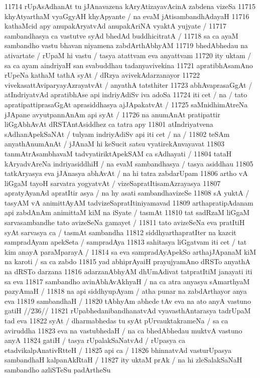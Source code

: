 11714 rUpAsAdhanAt tu jJAnavazena kAryAtizayavAcinA zabdena vizeSa
11715 khyAtyarthaM vyaGgyAH khyApyante / na evaM jAtisambandhAdayaH 
11716 kathaMcid apy anupakAryatvAd anupakAriNA vyaktA yujyate /
11717 	sambandhasya ca vastutve syAd bhedAd buddhicitratA / 
11718 sa ca ayaM sambandho vastu bhavan niyamena zabdArthAbhyAM 
11719 bhedAbhedau na ativartate / rUpaM hi vastu / tasya atattvam eva anyattvam 
11720 ity uktam / sa ca ayam aindriyaH san svabuddhau tadanyavivekina 
11721 apratibhAsamAno rUpeNa kathaM tathA syAt / dRzya avivekAdarzanayor
11722 vivekasattAviparyayAzrayatvAt / anyathA tatsthiter
11723 abhAvaprasaGgAt / atIndriyatvAd apratibhAse api indriyAdiSv iva adoSa
11724 iti cet / na / tato apratipattiprasaGgAt aprasiddhasya ajJApakatvAt / 
11725 saMnidhimAtreNa jJApane avyutpannAnAm api syAt /  
11726 na anumAnAt pratipattir liGgAbhAvAt dRSTAntAsiddhez ca tatra apy 
11801 atIndriyatvena sAdhanApekSaNAt / tulyam indriyAdiSv api iti cet / na /
11802 teSAm anyathAnumAnAt / jJAnaM hi keSucit satsu vyatirekAnvayavat
11803 tanmAtrAsambhavaM tadvyatiriktApekSAM ca sAdhayati / 
11804 tataH kAryadvAreNa indriyasiddhiH / na evaM sambandhasya / tasya asiddhau
11805 tatkAryasya eva jJAnasya abhAvAt / na hi tatra zabdarUpam 
11806 artho vA liGgaM tayoH sarvatra yogyatvAt / vizeSapratItisamAzrayasya
11807 apratyAyanAd apratItir asya / na hy asati sambandhavizeSe 
11808 sA yuktA / tasyAM vA animittAyAM tadvizeSapratItiniyamavad  
11809 arthapratipAdanam api zabdAnAm animittaM kiM na iSyate / tasmAt
11810 tat sadRzaM liGgaM sarvasambandhe tato avizeSeNa gamayet /
11811 tato avizeSeNa eva pratItiH syAt sarvasya ca / tasmAt sambandha 
11812 siddhyarthapratIter na kazcit sampradAyam apekSeta / sampradAya  
11813 sahitasya liGgatvam iti cet / tat kim anayA paraMparayA /
11814 sa eva sampradAyApekSo arthajJApanaM kiM na karoti / sa ca zabdo  
11815 yad abhiprAyaiH prayujyamAno dRSTo anyathA na dRSTo darzana  
11816 adarzanAbhyAM dhUmAdivat tatpratItiM janayati iti sa eva
11817 sambandho avinAbhAvAkhyaH / na ca atra anyasya sAmarthyaM pazyAmaH /
11818 na api siddhyupAyam / atha punar na zabdArthayor anya eva 
11819 sambandhaH /  
11820 	tAbhyAm abhede tAv eva na ato anyA vastuno gatiH //236//
11821 rUpabhedanibandhanatvAd vyavasthAntarasya tadrUpaM tad eva 
11822 syAt / dharmabhedas tu syAt pUrvauktakrameNa / sa ca aviruddha
11823 eva na vastubhedaH / na ca bhedAbhedau muktvA vastuno anyA  
11824 gatiH / tasya rUpalakSaNatvAd / rUpasya ca etadvikalpAnativRtteH / 
11825 api ca /
11826 	bhinnatvAd vasturUpasya sambandhaH kalpanAkRtaH /
11827 ity uktaM prAk / na hi zleSalakSaNaH sambandho azliSTeSu padArtheSu 
